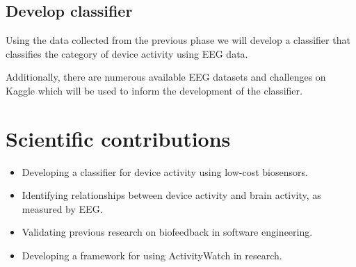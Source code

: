 \documentclass{IEEEtran}
\begin{document}
\begin{refsection}
\subsection{Develop classifier}

Using the data collected from the previous phase we will develop a classifier that classifies the category of device activity using EEG data.

Additionally, there are numerous available EEG datasets and challenges on Kaggle which will be used to inform the development of the classifier.




%




\section{Scientific contributions}

\begin{itemize}
  \item Developing a classifier for device activity using low-cost biosensors.
  \item Identifying relationships between device activity and brain activity, as measured by EEG\@.
  \item Validating previous research on biofeedback in software engineering.
  \item Developing a framework for using ActivityWatch in research.
\end{itemize}



\end{refsection}
\end{document}
